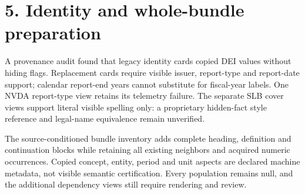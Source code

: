 \documentclass[10pt,a4paper]{article}
\begin{document}
\clearpage
\section*{5. Identity and whole-bundle preparation}
A provenance audit found that legacy identity cards copied DEI values without hiding flags. Replacement cards require visible issuer, report-type and report-date support; calendar report-end years cannot substitute for fiscal-year labels. One NVDA report-type view retains its telemetry failure. The separate SLB cover views support literal visible spelling only: a proprietary hidden-fact style reference and legal-name equivalence remain unverified.

The source-conditioned bundle inventory adds complete heading, definition and continuation blocks while retaining all existing neighbors and acquired numeric occurrences. Copied concept, entity, period and unit aspects are declared machine metadata, not visible semantic certification. Every population remains null, and the additional dependency views still require rendering and review.
\end{document}
